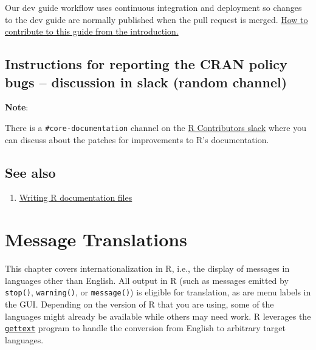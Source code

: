 \documentclass[
]{book}
\providecommand{\tightlist}{%
  \setlength{\itemsep}{0pt}\setlength{\parskip}{0pt}}
\begin{document}
Our dev guide workflow uses continuous integration and deployment so changes to the dev guide are normally published when the pull request is merged. \protect\hyperlink{how-to-contribute-to-this-guide}{How to contribute to this guide from the introduction.}

\hypertarget{instructions-for-reporting-the-cran-policy-bugs-discussion-in-slack-random-channel}{%
\section{Instructions for reporting the CRAN policy bugs -- discussion in slack (random channel)}\label{instructions-for-reporting-the-cran-policy-bugs-discussion-in-slack-random-channel}}

\textbf{Note}:

There is a \texttt{\#core-documentation} channel on the \href{https://r-contributors.slack.com/}{R Contributors slack} where you can discuss about the patches for improvements to R's documentation.

\hypertarget{see-also-5}{%
\section{See also}\label{see-also-5}}

\begin{enumerate}
\def\labelenumi{\arabic{enumi}.}
\tightlist
\item
  \href{https://cran.r-project.org/doc/manuals/r-release/R-exts.html\#Writing-R-documentation-files}{Writing R documentation files}
\end{enumerate}

\hypertarget{message-translations}{%
\chapter{Message Translations}\label{message-translations}}

This chapter covers internationalization in R, i.e., the display of messages in languages other than English. All
output in R (such as messages emitted by \texttt{stop()}, \texttt{warning()}, or \texttt{message()}) is eligible for translation, as
are menu labels in the GUI. Depending on the version of R that you are using, some of the languages might already
be available while others may need work. R leverages the \href{https://www.gnu.org/software/gettext/}{\texttt{gettext}} program
to handle the conversion from English to arbitrary target languages.
\end{document}
